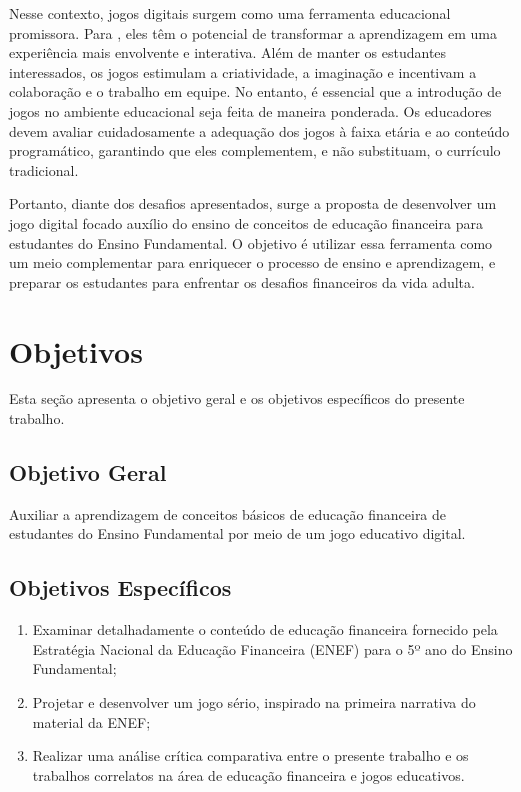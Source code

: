 Nesse contexto, jogos digitais surgem como uma ferramenta educacional promissora. Para \cite{Cruz_Araujo_Andrye_Galvao_Madeira_2022}, eles têm o potencial de transformar a aprendizagem em uma experiência mais envolvente e interativa. Além de manter os estudantes interessados, os jogos estimulam a criatividade, a imaginação e incentivam a colaboração e o trabalho em equipe. No entanto, é essencial que a introdução de jogos no ambiente educacional seja feita de maneira ponderada. Os educadores devem avaliar cuidadosamente a adequação dos jogos à faixa etária e ao conteúdo programático, garantindo que eles complementem, e não substituam, o currículo tradicional.

Portanto, diante dos desafios apresentados, surge a proposta de desenvolver um jogo digital focado auxílio do ensino de conceitos de educação financeira para estudantes do Ensino Fundamental. O objetivo é utilizar essa ferramenta como um meio complementar para enriquecer o processo de ensino e aprendizagem, e preparar os estudantes para enfrentar os desafios financeiros da vida adulta.

\section{Objetivos}
Esta seção apresenta o objetivo geral e os objetivos específicos do presente trabalho.

\subsection{Objetivo Geral}
Auxiliar a aprendizagem de conceitos básicos de educação financeira de estudantes do Ensino Fundamental por meio de um jogo educativo digital.

\subsection{Objetivos Específicos}
\begin{enumerate}[noitemsep,nosep,labelindent=\parindent,leftmargin=*,label={\alph*}) ]
	\item Examinar detalhadamente o conteúdo de educação financeira fornecido pela Estratégia Nacional da Educação Financeira (ENEF) para o 5º ano do Ensino Fundamental;
	\item Projetar e desenvolver um jogo sério, inspirado na primeira narrativa do material da ENEF;
	\item Realizar uma análise crítica comparativa entre o presente trabalho e os trabalhos correlatos na área de educação financeira e jogos educativos.
\end{enumerate}

